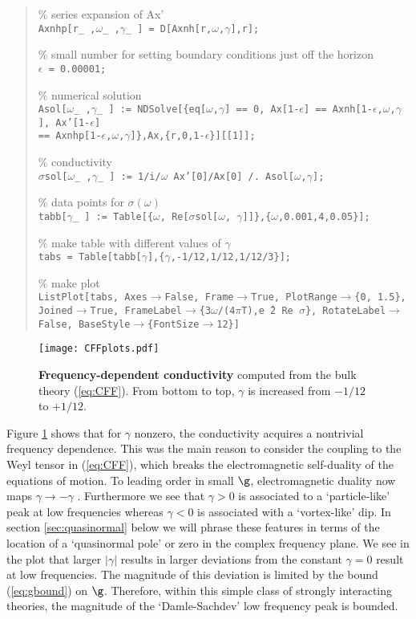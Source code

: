 \documentclass[10pt, oneside]{book}
\begin{document}
\begin{doublespace}
\begin{quote}
\%  series expansion of Ax' \\
\texttt{Axnhp[r\_\,,$\omega$\_\,,$\gamma$\_\,] = D[Axnh[r,$\omega$,$\gamma$],r];}

\%  small number for setting boundary conditions just off the horizon \\
\texttt{$\epsilon$\,=\,0.00001;}

\%  numerical solution \\
\texttt{Asol[$\omega$\_\,,$\gamma$\_\,] := 
 NDSolve[\{eq[$\omega$,$\gamma$]\,==\,0, Ax[1-$\epsilon$]\,==\,Axnh[1-$\epsilon$,$\omega$,$\gamma$], Ax'[1-$\epsilon$]\,\\==\,Axnhp[1-$\epsilon$,$\omega$,$\gamma$]\},Ax,\{r,0,1-$\epsilon$\}][[1]];}

\%  conductivity \\ 
\texttt{$\sigma$sol[$\omega$\_\,,$\gamma$\_\,] := 
 1/i/$\omega$ Ax'[0]/Ax[0] /.\,Asol[$\omega$,$\gamma$];}

\%  data points for $\sigma(\omega)$ \\
\texttt{tabb[$\gamma$\_\,] := 
 Table[\{$\omega$, Re[$\sigma$sol[$\omega$, $\gamma$]]\},\{$\omega$,0.001,4,0.05\}];}

\%  make table with different values of $\gamma$ \\
\texttt{tabs = Table[tabb[$\gamma$],\{$\gamma$,-1/12,1/12,1/12/3\}];}

\%  make plot \\
\texttt{ListPlot[tabs, Axes$\to$False, Frame$\to$True, PlotRange$\to$\{0, 1.5\}, Joined$\to$True, FrameLabel$\to$\{3$\omega$/(4$\pi$T),e\^\,2 Re $\sigma$\}, RotateLabel$\to$False, BaseStyle$\to$\{FontSize$\to$12\}]} 

\end{quote}

\begin{figure}[h]
\centering
\texttt{[image: CFFplots.pdf]}
\caption{\label{fig:CFF} {\bf Frequency-dependent conductivity} computed from the bulk theory (\ref{eq:CFF}).
From bottom to top, $\gamma$ is increased from $-1/12$ to $+1/12$.}
\end{figure}
Figure \ref{fig:CFF} shows that for $\gamma$ nonzero, the conductivity acquires a nontrivial frequency dependence. This was the main reason to consider the coupling to the Weyl tensor in (\ref{eq:CFF}), which breaks the electromagnetic self-duality of the equations of motion. To leading order in small $\g$, electromagnetic duality now maps $\gamma \to - \gamma$ \cite{Myers:2010pk, WitczakKrempa:2012gn}. Furthermore we see that $\gamma > 0$ is associated to a `particle-like' peak at low frequencies whereas $\gamma < 0$ is associated with a `vortex-like' dip. In section \ref{sec:quasinormal} below we will phrase these features in terms of the location of a `quasinormal pole' or zero in the complex frequency plane. We see in the plot that larger $|\gamma|$ results in larger deviations from the constant $\gamma=0$ result at low frequencies. The magnitude of this deviation is limited by the bound (\ref{eq:gbound}) on $\g$. Therefore, within this simple class of strongly interacting theories, the magnitude of the `Damle-Sachdev' \cite{PhysRevB.56.8714} low frequency peak is bounded.


\end{doublespace}
\end{document}
